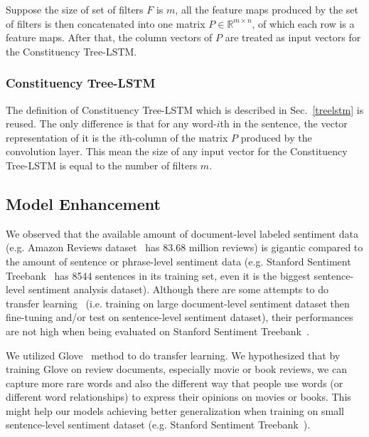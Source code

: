 Suppose the size of set of filters \(F\) is \(m\), all the feature maps produced by the set of filters is then concatenated into one matrix \(P \in \mathbb{R}^{m \times n}\), of which each row is a feature maps.
After that, the column vectors of \(P\) are treated as input vectors for the Constituency Tree-LSTM.
\subsubsection{Constituency Tree-LSTM}
The definition of Constituency Tree-LSTM which is described in Sec.~\ref{treelstm} is reused.
The only difference is that for any word-\(i\)th in the sentence, the vector representation of it is the \(i\)th-column of the matrix \(P\) produced by the convolution layer.
This mean the size of any input vector for the Constituency Tree-LSTM is equal to the number of filters \(m\).
\subsection{Model Enhancement}
We observed that the available amount of document-level labeled sentiment data (e.g. Amazon Reviews dataset~\cite{amazon-reviews} has 83.68 million reviews) is gigantic compared to the amount of sentence or phrase-level sentiment data (e.g. Stanford Sentiment Treebank~\cite{socher2013recursive} has 8544 sentences in its training set, even it is the biggest sentence-level sentiment analysis dataset).
Although there are some attempts to do transfer learning~\cite{group-instance, re-embedding} (i.e. training on large document-level sentiment dataset then fine-tuning and/or test on sentence-level sentiment dataset), their performances are not high when being evaluated on Stanford Sentiment Treebank~\cite{group-instance}.

We utilized Glove~\cite{glove} method to do transfer learning.
We hypothesized that by training Glove on review documents, especially movie or book reviews, we can capture more rare words and also the different way that people use words (or different word relationships) to express their opinions on movies or books.
This might help our models achieving better generalization when training on small sentence-level sentiment dataset (e.g. Stanford Sentiment Treebank~\cite{socher2013recursive}).